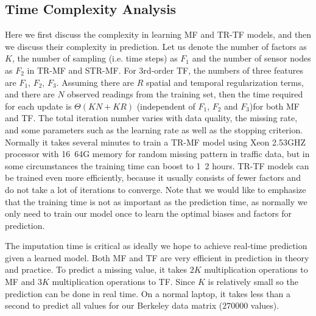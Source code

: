 \subsection{Time Complexity Analysis}
Here we first discuss the complexity in learning MF and TR-TF models, and then we discuss their complexity in prediction.
Let us denote the number of factors as $K$, the number of sampling (i.e. time steps) as $F_1$ and the number of sensor nodes as $F_2$ in TR-MF and STR-MF. For 3rd-order TF, the numbers of three features are $F_1$, $F_2$, $F_3$.  
Assuming there are $R$ spatial and temporal regularization terms, and there are $N$ observed readings from the training set, then the time required for each update is $\Theta(KN + KR)$ (independent of $F_1$, $F_2$ and $F_3$)for both MF and TF.
The total iteration number varies with data quality, the missing rate, and some parameters such as the learning rate as well as the stopping criterion. Normally it takes several minutes to train a TR-MF model using Xeon 2.53GHZ processor with 16~64G memory for random missing pattern in traffic data, but in some circumstances the training time can boost to 1~2 hours. TR-TF models can be trained even more efficiently, because it usually consists of fewer factors and do not take a lot of iterations to converge. 
Note that we would like to emphasize that the training time is not as important as the prediction time, as normally we only need to train our model once to learn the optimal biases and factors for prediction.

The imputation time is critical as ideally we hope to achieve real-time prediction given a learned model. 
Both MF and TF are very efficient in prediction in theory and practice.
To predict a missing value, it takes $2K$ multiplication operations to MF and $3K$ multiplication operations to TF.
Since $K$ is relatively small so the prediction can be done in real time.
On a normal laptop, it takes less than a second to predict all values for our Berkeley data matrix ($270000$ values).

